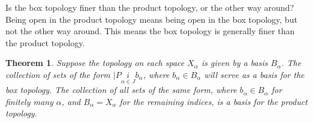 \documentclass[11pt]{article}
\newtheorem{theorem}{Theorem}[section]
\begin{document}
Is the box topology finer than the product topology, or the other way
around? Being open in the product topology means being open in the box
topology, but not the other way around. This means the box topology is
generally finer than the product topology.

\begin{theorem}
Suppose the topology on each space \(X_{\alpha}\) is given by a basis
\(B_{\alpha}\). The collection of sets of the form \(|Pi\limits_{\alpha
\in J}b_{\alpha}\), where \(b_{\alpha}\in B_{\alpha}\) will serve as a
basis for the box topology. The collection of all sets of the same
form, where \(b_{\alpha}\in B_{\alpha}\) for finitely many \(\alpha\), and
\(B_{\alpha} = X_{\alpha}\) for the remaining indices, is a basis for
the product topology. 
\end{theorem}
\end{document}
